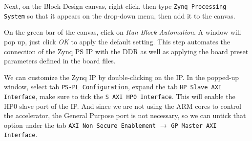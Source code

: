 \documentclass[11pt]{article}
\begin{document}
Next, on the Block Design canvas, right click, then type \texttt{Zynq Processing System} so that it appears on the drop-down menu, then add it to the canvas.

\begin{center}
\end{center}

On the green bar of the canvas, click on \emph{Run Block Automation}. A window will pop up, just click \emph{OK} to apply the default setting. This step automates the connection of the Zynq PS IP with the DDR as well as applying the board preset parameters defined in the board files.

\begin{center}
\end{center}

We can customize the Zynq IP by double-clicking on the IP. In the popped-up window, select tab \texttt{PS-PL Configuration}, expand the tab \texttt{HP Slave AXI Interface}, make sure to tick the \texttt{S AXI HP0 Interface}. This will enable the HP0 slave port of the IP. And since we are not using the ARM cores to control the accelerator, the General Purpose port is not necessary, so we can untick that option under the tab \texttt{AXI Non Secure Enablement} $\rightarrow$ \texttt{GP Master AXI Interface}.
\end{document}
